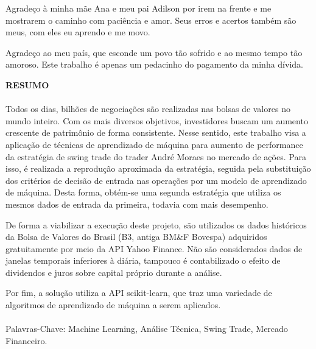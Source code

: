 


Agrade\c{c}o \`a minha m\~ae Ana e meu pai Adilson por irem na frente e me mostrarem o caminho com paci\^encia e amor.
Seus erros e acertos tamb\'em s\~ao meus, com eles eu aprendo e me movo.

Agrade\c{c}o ao meu pa\'is, que esconde um povo t\~ao sofrido e ao mesmo tempo t\~ao amoroso. Este trabalho é apenas um pedacinho do pagamento da minha d\'ivida.


\pagebreak


\begin{center}
\textbf{RESUMO}
\end{center}
      \vspace{0.5cm}

\paragraph{}
Todos os dias, bilhões de negociações são realizadas nas bolsas de valores no mundo inteiro. Com os mais diversos objetivos, investidores buscam um aumento crescente de patrimônio de forma consistente. Nesse sentido, este trabalho visa a aplicação de técnicas de aprendizado de máquina para aumento de performance da estratégia de swing trade do trader André Moraes no mercado de ações. Para isso, é realizada a reprodução aproximada da estratégia, seguida pela substituição dos critérios de decisão de entrada nas operações por um modelo de aprendizado de máquina. Desta forma, obtém-se uma segunda estratégia que utiliza os mesmos dados de entrada da primeira, todavia com mais desempenho.

De forma a viabilizar a execução deste projeto, são utilizados os dados históricos da Bolsa de Valores do Brasil (B3, antiga BM\&F Bovespa) adquiridos gratuitamente por meio da API Yahoo Finance. Não são considerados dados de janelas temporais inferiores à diária, tampouco é contabilizado o efeito de dividendos e juros sobre capital próprio durante a análise.

Por fim, a solução utiliza a API scikit-learn, que traz uma variedade de algoritmos de aprendizado de máquina a serem aplicados.
\paragraph{}
\noindent Palavras-Chave: Machine Learning, Análise Técnica, Swing Trade, Mercado Financeiro.

